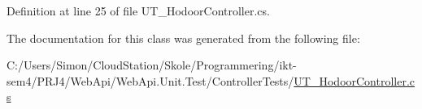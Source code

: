 Definition at line 25 of file U\+T\+\_\+\+Hodoor\+Controller.\+cs.



The documentation for this class was generated from the following file\+:\begin{DoxyCompactItemize}
\item 
C\+:/\+Users/\+Simon/\+Cloud\+Station/\+Skole/\+Programmering/ikt-\/sem4/\+P\+R\+J4/\+Web\+Api/\+Web\+Api.\+Unit.\+Test/\+Controller\+Tests/\mbox{\hyperlink{_u_t___hodoor_controller_8cs}{U\+T\+\_\+\+Hodoor\+Controller.\+cs}}\end{DoxyCompactItemize}
